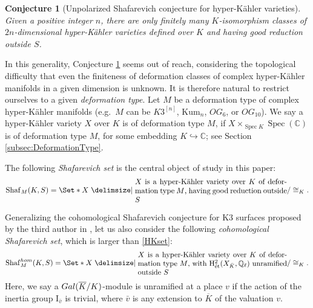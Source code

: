 \documentclass[11pt,reqno,oneside]{amsart}
\numberwithin{equation}{section}
\newtheorem{conjecture}[theorem]{Conjecture}
\theoremstyle{definition}
\DeclareMathOperator{\Spec}{Spec}
\newcommand{\Gal}{{\rm Gal}}
\DeclareMathOperator{\et}{\Acute{e}t}
\renewcommand{\hom}{{\rm hom}}
\newcommand{\Sha}{\mathrm{Shaf}}
\newcommand\rH{\mathrm{H}}
\newcommand\rI{\mathrm{I}}
\newcommand{\QQ}{\mathbb{Q}}
\begin{document}
\begin{conjecture}[{Unpolarized Shafarevich conjecture for hyper-Kähler varieties}]\label{conj1}
 Given a positive integer $n$, there are only finitely many $K$-isomorphism classes of  $2n$-dimensional hyper-Kähler varieties defined over $K$ and having good reduction outside $S$.
\end{conjecture}

In this generality, Conjecture \ref{conj1} seems out of reach, considering the topological difficulty that even the finiteness of deformation classes of complex hyper-Kähler manifolds in a given dimension is unknown. It is therefore natural to restrict ourselves to a given \textit{deformation type}. Let $M$ be a deformation type of complex hyper-Kähler manifolds (e.g.~$M$ can be $K3^{[n]}$, $\mathrm{Kum}_n$, $OG_6$, or $OG_{10}$). We say a hyper-Kähler variety $X$ over $K$ is of deformation type $M$, if $X\times_{\Spec K} \Spec(\mathbb{C})$ is of deformation type $M$, for some embedding $K\hookrightarrow \mathbb{C}$; see Section \ref{subsec:DeformationType}.

The following \textit{Shafarevich set} is the central object of study in this paper:
	\begin{equation}\label{HKset}
	\Sha_{M}(K,S)=\Set*{ X \given \parbox{20em}{$X$ is a hyper-Kähler variety over $K$ of deformation type $M$, having good reduction outside $S$}
    }/ \cong_{K}.
	\end{equation}

Generalizing the cohomological Shafarevich conjecture for K3 surfaces proposed by the third author in \cite{Takamatsu2020K3}, let us also consider the following \textit{cohomological Shafarevich set}, which is larger than \eqref{HKset}:
\begin{equation}\label{homHKset}
	\Sha_{M}^{\hom}(K,S)=\Set*{ X \given \parbox{20em}{$X$ is a hyper-Kähler variety over $K$ of deformation type $M$, with $\rH^2_{\et}(X_{\bar{K}},\QQ_{\ell})$ unramified outside $S$}
    }/ \cong_{K}.
	\end{equation}
Here, we say a $\Gal(\overline{K}/K)$-module is unramified at a place $v$ if the action of the inertia group $\rI_{\bar{v}}$ is trivial, where $\bar{v}$ is any extension to $\overline{K}$ of the valuation $v$. 
\end{document}
